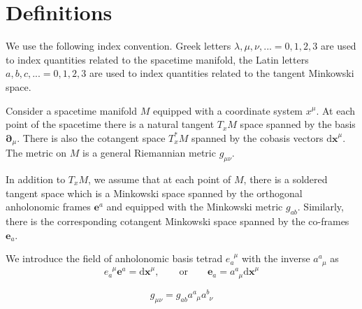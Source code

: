 \documentclass[
10pt, %
a4paper, %
oneside, %
headinclude,footinclude, %
BCOR5mm, %
]{scrartcl}
\newcommand{\xx}{\mathbf{x}}
\newcommand{\dx}{\mathrm{d}\xx}
\newcommand{\pd}{\partial}
\newcommand{\itetr}[2]{e^{\phantom{#2}#1}_{#2}}
\newcommand{\tetr}[2]{a^{#1}_{\phantom{#1}#2}}
\begin{document}


\setlength\parindent{10pt} %
\setlength{\parskip}{5pt} %


\section{Definitions}

We use the following index convention. Greek letters $ \lambda,\mu,\nu,... =0,1,2,3
$ are used to index quantities related to the spacetime manifold, the Latin letters $ a,b,c,... 
=0,1,2,3$ are used to index quantities related to the tangent Minkowski space.



Consider a spacetime manifold $ M $ equipped with a coordinate system $ x^\mu $. At each point of 
the spacetime there is a natural tangent $ T_{x}M $ space spanned by the basis $ \bm{\pd}_\mu $. 
There is also the cotangent space $ T_x^*M $ spanned by the cobasis vectors $ \bm{\dx}^\mu $.
The metric on $ M $ is a general Riemannian metric $ g_{\mu\nu} $.

In addition to $ T_{x}M $, we assume that at each point of $ M $, there is a soldered tangent space 
which is a Minkowski space spanned by the orthogonal anholonomic 
frames $ \bm{e}^a $ and equipped with the Minkowski metric $ g_{ab} $. Similarly, there is the 
corresponding cotangent Minkowski space spanned by the co-frames $ \bm{e}_a $. 

We introduce the field of anholonomic basis tetrad $ \itetr{\mu}{a} $ with the inverse $ 
\tetr{a}{\mu} $ as
\begin{equation}
\itetr{\mu}{a} \bm{e}^a = \bm{\dx}^\mu, \qquad \text{or} \qquad \bm{e}_a = \tetr{a}{\mu}\bm{\dx}^\mu
\end{equation}


\begin{equation}
g_{\mu\nu} = g_{ab} \tetr{a}{\mu}\tetr{b}{\nu}
\end{equation}
\end{document}
